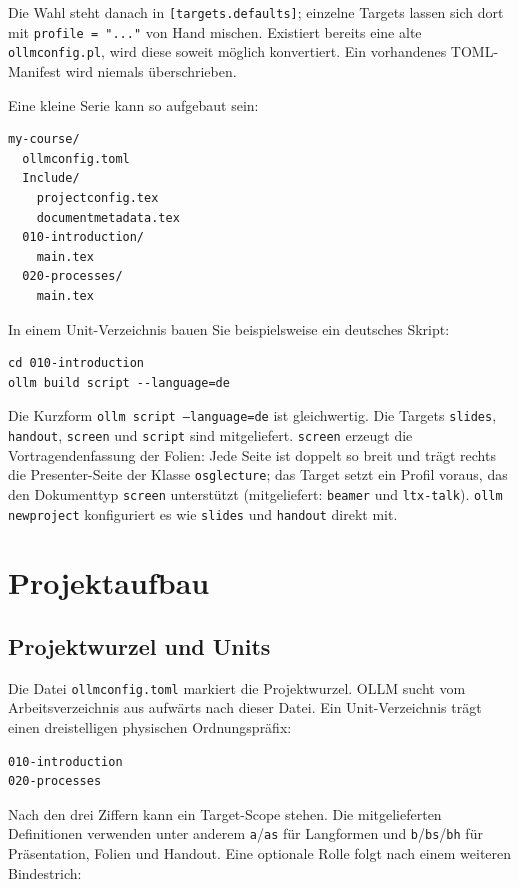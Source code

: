 \documentclass[
load-preamble+
]{osgdoc}
\begin{document}
Die Wahl steht danach in \texttt{[targets.defaults]}; einzelne Targets lassen
sich dort mit \texttt{profile = "..."} von Hand mischen. Existiert bereits
eine alte \texttt{ollmconfig.pl}, wird diese soweit möglich konvertiert. Ein
vorhandenes TOML-Manifest wird niemals überschrieben.

Eine kleine Serie kann so aufgebaut sein:

\begin{verbatim}
my-course/
  ollmconfig.toml
  Include/
    projectconfig.tex
    documentmetadata.tex
  010-introduction/
    main.tex
  020-processes/
    main.tex
\end{verbatim}

In einem Unit-Verzeichnis bauen Sie beispielsweise ein deutsches Skript:

\begin{verbatim}
cd 010-introduction
ollm build script --language=de
\end{verbatim}

Die Kurzform \texttt{ollm script --language=de} ist gleichwertig. Die Targets
\texttt{slides}, \texttt{handout}, \texttt{screen} und \texttt{script} sind
mitgeliefert. \texttt{screen} erzeugt die Vortragendenfassung der Folien: Jede
Seite ist doppelt so breit und trägt rechts die Presenter-Seite der Klasse
\texttt{osglecture}; das Target setzt ein Profil voraus, das den Dokumenttyp
\texttt{screen} unterstützt (mitgeliefert: \texttt{beamer} und
\texttt{ltx-talk}). \texttt{ollm newproject} konfiguriert es wie
\texttt{slides} und \texttt{handout} direkt mit.

\section{Projektaufbau}

\subsection{Projektwurzel und Units}

Die Datei \texttt{ollmconfig.toml} markiert die Projektwurzel. OLLM sucht vom
Arbeitsverzeichnis aus aufwärts nach dieser Datei. Ein Unit-Verzeichnis trägt
einen dreistelligen physischen Ordnungspräfix:

\begin{verbatim}
010-introduction
020-processes
\end{verbatim}

Nach den drei Ziffern kann ein Target-Scope stehen. Die mitgelieferten
Definitionen verwenden unter anderem \texttt{a}/\texttt{as} für Langformen
und \texttt{b}/\texttt{bs}/\texttt{bh} für Präsentation, Folien und Handout.
Eine optionale Rolle folgt nach einem weiteren Bindestrich:
\end{document}
